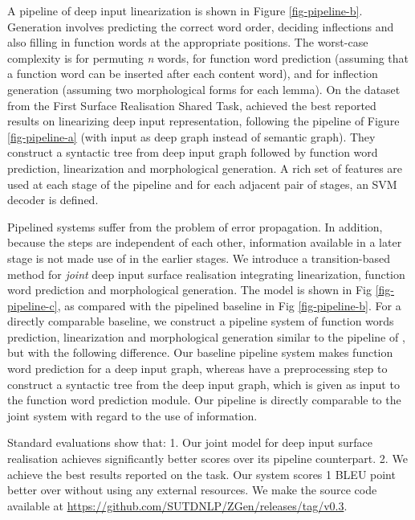 \documentclass[11pt]{article}
\begin{document}
A pipeline of deep input linearization is shown in Figure \ref{fig-pipeline-b}. Generation involves predicting the correct word order, deciding inflections and also filling in function words at the appropriate positions. The worst-case complexity is  for permuting {\it n} words,  for function word prediction (assuming that a function word can be inserted after each content word), and  for inflection generation (assuming two morphological forms for each lemma). On the dataset from the First Surface Realisation Shared Task,  achieved the best reported results on linearizing deep input representation, following the pipeline of Figure \ref{fig-pipeline-a} (with input as deep graph instead of semantic graph). They construct a syntactic tree from deep input graph followed by function word prediction, linearization and morphological generation. A rich set of features are used at each stage of the pipeline and for each adjacent pair of stages, an SVM decoder is defined. 

Pipelined systems suffer from the problem of error propagation. In addition, because the steps are independent of each other, information available in a later stage is not made use of in the earlier stages. We introduce a transition-based \cite{J08-4003} method for {\it joint} deep input surface realisation integrating linearization, function word prediction and morphological generation. The model is shown in Fig \ref{fig-pipeline-c}, as compared with the pipelined baseline in Fig \ref{fig-pipeline-b}. For a directly comparable baseline, we construct a pipeline system of function words prediction, linearization and morphological generation similar to the pipeline of , but with the following difference. Our baseline pipeline system makes function word prediction for a deep input graph, whereas  have a preprocessing step to construct a syntactic tree from the deep input graph, which is given as input to the function word prediction module. Our pipeline is directly comparable to the joint system with regard to the use of information.

Standard evaluations show that: 1. Our joint model for deep input surface realisation achieves significantly better scores over its pipeline counterpart. 2. We achieve the best results reported on the task. Our system scores 1 BLEU point better over  without using any external resources. We make the source code available at \url{https://github.com/SUTDNLP/ZGen/releases/tag/v0.3}.
\end{document}
